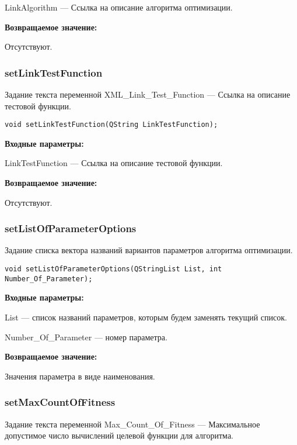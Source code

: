 \documentclass[a4paper,12pt]{article}
\begin{document}
LinkAlgorithm --- Ссылка на описание алгоритма оптимизации.

\textbf{Возвращаемое значение:}

Отсутствуют.


\subsubsection{setLinkTestFunction}\label{setLinkTestFunction}

Задание текста переменной  XML\_Link\_Test\_Function --- Ссылка на описание тестовой функции.


\begin{lstlisting}[label=code_syntax_setLinkTestFunction,caption=Синтаксис]
void setLinkTestFunction(QString LinkTestFunction);
\end{lstlisting}

\textbf{Входные параметры:}

LinkTestFunction --- Ссылка на описание тестовой функции.

\textbf{Возвращаемое значение:}

Отсутствуют.


\subsubsection{setListOfParameterOptions}\label{setListOfParameterOptions}

Задание списка вектора названий вариантов параметров алгоритма оптимизации.


\begin{lstlisting}[label=code_syntax_setListOfParameterOptions,caption=Синтаксис]
void setListOfParameterOptions(QStringList List, int Number_Of_Parameter);
\end{lstlisting}

\textbf{Входные параметры:}

List --- список названий параметров, которым будем заменять текущий список.

Number\_Of\_Parameter --- номер параметра.

\textbf{Возвращаемое значение:}

Значения параметра в виде наименования.


\subsubsection{setMaxCountOfFitness}\label{setMaxCountOfFitness}

Задание текста переменной  Max\_Count\_Of\_Fitness --- Максимальное допустимое число вычислений целевой функции для алгоритма.
\end{document}
